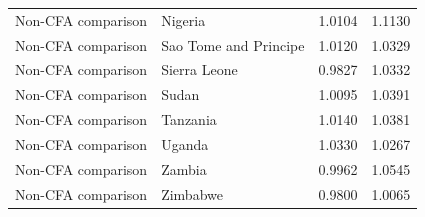 \begin{table}
\begin{tabular}[t]{llrr}
Non-CFA comparison & Nigeria & 1.0104 & 1.1130\\
Non-CFA comparison & Sao Tome and Principe & 1.0120 & 1.0329\\
Non-CFA comparison & Sierra Leone & 0.9827 & 1.0332\\
\addlinespace
Non-CFA comparison & Sudan & 1.0095 & 1.0391\\
Non-CFA comparison & Tanzania & 1.0140 & 1.0381\\
Non-CFA comparison & Uganda & 1.0330 & 1.0267\\
Non-CFA comparison & Zambia & 0.9962 & 1.0545\\
Non-CFA comparison & Zimbabwe & 0.9800 & 1.0065\\
\bottomrule
\end{tabular}
\end{table}